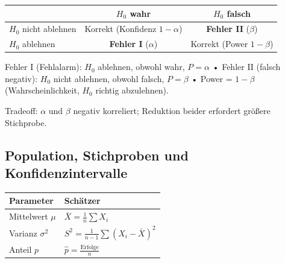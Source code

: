 
\begin{center}
    \small
    \begin{tabular}{|l|c|c|}
        \hline
                             & $H_0$ wahr                     & $H_0$ falsch                 \\
        \hline
        $H_0$ nicht ablehnen & Korrekt (Konfidenz $1-\alpha$) & \textbf{Fehler II} ($\beta$) \\
        \hline
        $H_0$ ablehnen       & \textbf{Fehler I} ($\alpha$)   & Korrekt (Power $1-\beta$)    \\
        \hline
    \end{tabular}
\end{center}

Fehler I (Fehlalarm): $H_0$ ablehnen, obwohl wahr, $P = \alpha$ • 
Fehler II (falsch negativ): $H_0$ nicht ablehnen, obwohl falsch, $P = \beta$ • 
Power = $1 - \beta$ (Wahrscheinlichkeit, $H_0$ richtig abzulehnen).

Tradeoff: $\alpha$ und $\beta$ negativ korreliert; Reduktion beider erfordert größere Stichprobe.
\newpage

\subsection{Population, Stichproben und Konfidenzintervalle}


\begin{center}
    \small
    \begin{tabular}{|l|l|}
        \hline
        \textbf{Parameter} & \textbf{Schätzer}                           \\
        \hline
        Mittelwert $\mu$   & $\bar{X} = \frac{1}{n}\sum X_i$             \\
        \hline
        Varianz $\sigma^2$ & $S^2 = \frac{1}{n-1}\sum (X_i - \bar{X})^2$ \\
        \hline
        Anteil $p$         & $\hat{p} = \frac{\text{Erfolge}}{n}$        \\
        \hline
    \end{tabular}
\end{center}

